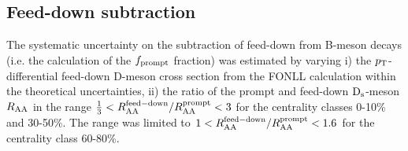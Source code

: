 \subsection{Feed-down subtraction}
The systematic uncertainty on the subtraction of feed-down from B-meson decays 
(i.e. the calculation of the $f_{\rm prompt}$ fraction) was estimated by varying i)
the $p_{\rm T}$-differential feed-down D-meson cross section from the 
FONLL calculation within the theoretical uncertainties, ii)  the ratio of the 
prompt and feed-down ${\rm D_s}$-meson $R_{\rm AA}$ in the 
range $\frac{1}{3} < R_{\rm AA}^{\rm  feed-down}/R_{\rm AA}^{\rm prompt} < 3$ 
for the centrality classes 0-10\% and 30-50\%. The range was limited to 
$1 < R_{\rm AA}^{\rm  feed-down}/R_{\rm AA}^{\rm prompt} < 1.6$ 
for the centrality class 60-80\%. 

